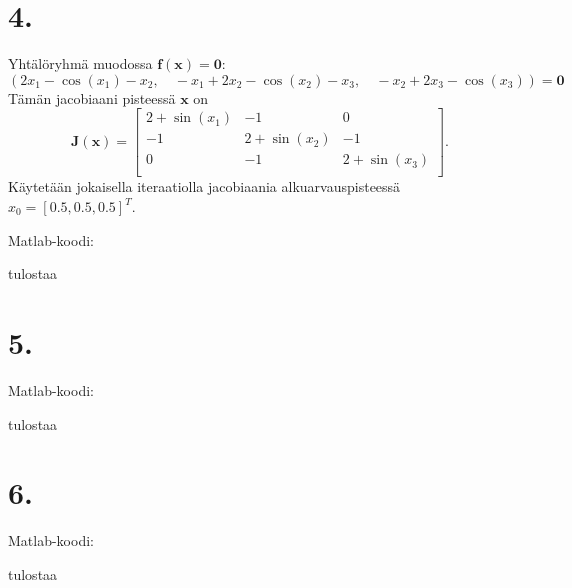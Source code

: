 \documentclass{article}
\begin{document}
\section*{4.}

Yhtälöryhmä muodossa $\mathbf{f}(\mathbf{x}) = \mathbf{0}$:
\[
  (
    2x_1 - \cos(x_1) - x_2, \quad
    -x_1 + 2x_2 - \cos(x_2) - x_3, \quad
    -x_2 + 2x_3 - \cos(x_3)
    ) = \mathbf{0}
\]
Tämän jacobiaani pisteessä $\mathbf{x}$ on
\[
  \mathbf{J}(\mathbf{x}) =
  \begin{bmatrix}
    2 + \sin(x_1) & -1 & 0 \\
    -1 & 2 + \sin(x_2) & -1 \\
    0 & -1 & 2 + \sin(x_3) \\
  \end{bmatrix}.
\]
Käytetään jokaisella iteraatiolla jacobiaania alkuarvauspisteessä
$x_0 = [0.5, 0.5, 0.5]^T$.

Matlab-koodi:



tulostaa




\section*{5.}

Matlab-koodi:




tulostaa




\section*{6.}

Matlab-koodi:



tulostaa


\end{document}
